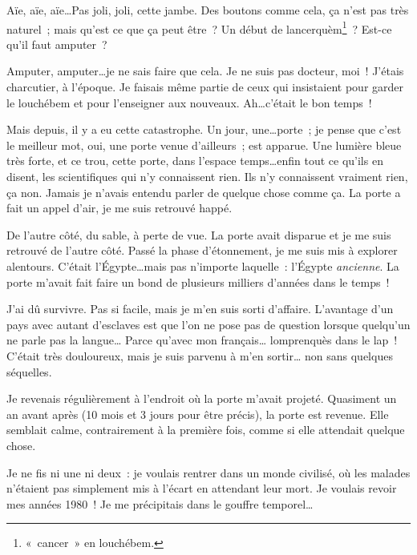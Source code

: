 {
        Aïe, aïe, aïe\ldots  Pas joli, joli, cette jambe.
        Des boutons comme cela, ça n’est pas très naturel~; mais qu’est ce que ça peut être~?
        Un début de lancerquèm\footnote{«~cancer~» en louchébem.}~?  Est-ce qu’il faut amputer~?

        Amputer, amputer\ldots je ne sais faire que cela.
        Je ne suis pas docteur, moi~!  J’étais charcutier, à l’époque.
        Je faisais même partie de ceux qui insistaient pour garder le louchébem et pour l’enseigner aux nouveaux.
        Ah\ldots c’était le bon temps~!

        Mais depuis, il y a eu cette catastrophe.
        Un jour, une\ldots porte~; je pense que c’est le meilleur mot, oui, une porte venue d’ailleurs~; est apparue.
        Une lumière bleue très forte, et ce trou, cette porte, dans l’espace temps\ldots enfin tout ce qu’ils en disent, les scientifiques qui n’y connaissent rien.
        Ils n’y connaissent vraiment rien, ça non.
        Jamais je n’avais entendu parler de quelque chose comme ça.
        La porte a fait un appel d’air, je me suis retrouvé happé.

        De l’autre côté, du sable, à perte de vue.
        La porte avait disparue et je me suis retrouvé de l’autre côté.
        Passé la phase d’étonnement, je me suis mis à explorer alentours.
        C’était l’Égypte\ldots mais pas n’importe laquelle~:  l’Égypte \emph{ancienne}.
        La porte m’avait fait faire un bond de plusieurs milliers d’années dans le temps~!

        J’ai dû survivre.  Pas si facile, mais je m’en suis sorti d’affaire.
		L’avantage d’un pays avec autant d’esclaves est que l’on ne pose pas de question lorsque quelqu’un ne parle pas la langue…  Parce qu’avec mon français… lomprenquès dans le lap~!
		C’était très douloureux, mais je suis parvenu à m’en sortir… non sans quelques séquelles.

        Je revenais régulièrement à l’endroit où la porte m’avait projeté.
        Quasiment un an avant après (10 mois et 3 jours pour être précis), la porte est revenue.
        Elle semblait calme, contrairement à la première fois, comme si elle attendait quelque chose.

        Je ne fis ni une ni deux~:  je voulais rentrer dans un monde civilisé, où les malades n’étaient pas simplement mis à l’écart en attendant leur mort.
        Je voulais revoir mes années 1980~!
        Je me précipitais dans le gouffre temporel\ldots

}
